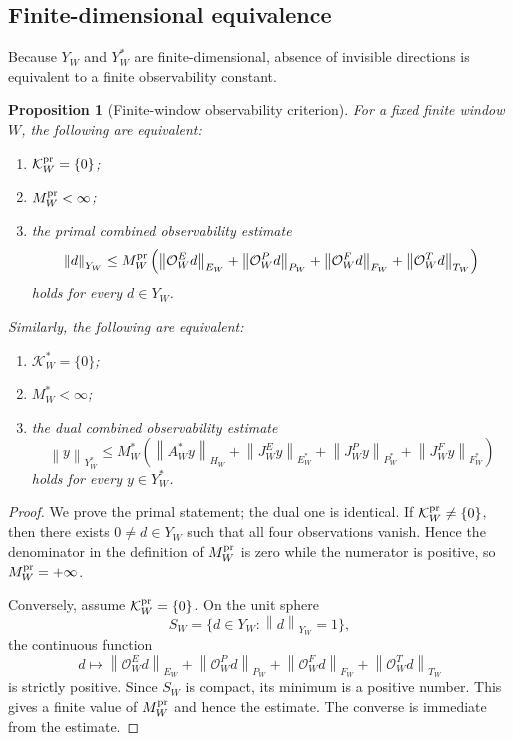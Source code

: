 \documentclass[11pt]{article}
\numberwithin{equation}{section}
\theoremstyle{plain}
\newtheorem{proposition}[theorem]{Proposition}
\theoremstyle{definition}
\theoremstyle{remark}
\newcommand{\norm}[2]{\left\|#1\right\|_{#2}}
\newcommand{\calK}{\mathcal K}
\newcommand{\calO}{\mathcal O}
\begin{document}
\subsection{Finite-dimensional equivalence}

Because \(Y_W\) and \(Y_W^*\) are finite-dimensional, absence of invisible directions is equivalent to a finite observability constant.

\begin{proposition}[Finite-window observability criterion]
For a fixed finite window \(W\), the following are equivalent:
\begin{enumerate}
  \item \(\calK_W^{\rm pr}=\{0\}\);
  \item \(M_W^{\rm pr}<\infty\);
  \item the primal combined observability estimate
  \[
  \norm{d}{Y_W}
  \le
  M_W^{\rm pr}
  \left(
    \norm{\calO_W^Ed}{E_W}
    +\norm{\calO_W^Pd}{P_W}
    +\norm{\calO_W^Fd}{F_W}
    +\norm{\calO_W^Td}{T_W}
  \right)
  \]
  holds for every \(d\in Y_W\).
\end{enumerate}
Similarly, the following are equivalent:
\begin{enumerate}
  \item \(\calK_W^*=\{0\}\);
  \item \(M_W^*<\infty\);
  \item the dual combined observability estimate
  \[
  \norm{y}{Y_W^*}
  \le
  M_W^*
  \left(
    \norm{A_W^*y}{H_W}
    +\norm{J_W^Ey}{E_W^*}
    +\norm{J_W^Py}{P_W^*}
    +\norm{J_W^Fy}{F_W^*}
  \right)
  \]
  holds for every \(y\in Y_W^*\).
\end{enumerate}
\end{proposition}

\begin{proof}
We prove the primal statement; the dual one is identical.  If \(\calK_W^{\rm pr}\ne\{0\}\), then there exists \(0\ne d\in Y_W\) such that all four observations vanish.  Hence the denominator in the definition of \(M_W^{\rm pr}\) is zero while the numerator is positive, so \(M_W^{\rm pr}=+\infty\).

Conversely, assume \(\calK_W^{\rm pr}=\{0\}\).  On the unit sphere
\[
  S_W=\{d\in Y_W:\norm{d}{Y_W}=1\},
\]
the continuous function
\[
  d\mapsto
  \norm{\calO_W^Ed}{E_W}
  +\norm{\calO_W^Pd}{P_W}
  +\norm{\calO_W^Fd}{F_W}
  +\norm{\calO_W^Td}{T_W}
\]
is strictly positive.  Since \(S_W\) is compact, its minimum is a positive number.  This gives a finite value of \(M_W^{\rm pr}\) and hence the estimate.  The converse is immediate from the estimate.
\end{proof}
\end{document}
